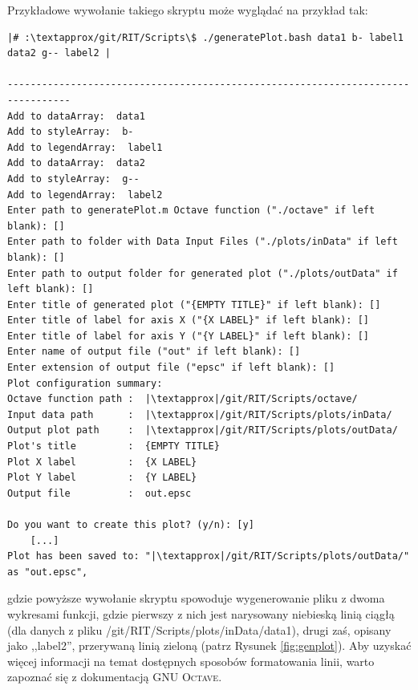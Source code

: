 
Przykładowe wywołanie takiego skryptu może wyglądać na przykład tak:

\begin{verbatim}
|# :\textapprox/git/RIT/Scripts\$ ./generatePlot.bash data1 b- label1 data2 g-- label2 |

---------------------------------------------------------------------------------
Add to dataArray:  data1
Add to styleArray:  b-
Add to legendArray:  label1
Add to dataArray:  data2
Add to styleArray:  g--
Add to legendArray:  label2
Enter path to generatePlot.m Octave function ("./octave" if left blank): []
Enter path to folder with Data Input Files ("./plots/inData" if left blank): [] 
Enter path to output folder for generated plot ("./plots/outData" if left blank): []
Enter title of generated plot ("{EMPTY TITLE}" if left blank): []
Enter title of label for axis X ("{X LABEL}" if left blank): []
Enter title of label for axis Y ("{Y LABEL}" if left blank): []
Enter name of output file ("out" if left blank): []
Enter extension of output file ("epsc" if left blank): []
Plot configuration summary: 
Octave function path :	|\textapprox|/git/RIT/Scripts/octave/
Input data path      :	|\textapprox|/git/RIT/Scripts/plots/inData/
Output plot path     :	|\textapprox|/git/RIT/Scripts/plots/outData/
Plot's title         :	{EMPTY TITLE}
Plot X label         :	{X LABEL}
Plot Y label         :	{Y LABEL}
Output file          :	out.epsc

Do you want to create this plot? (y/n): [y]
	[...]
Plot has been saved to: "|\textapprox|/git/RIT/Scripts/plots/outData/" as "out.epsc",
\end{verbatim}
gdzie powyższe wywołanie skryptu spowoduje wygenerowanie pliku z dwoma wykresami funkcji, gdzie pierwszy z nich jest narysowany niebieską linią ciągłą (dla danych z pliku \textsf{\textapprox/git/RIT/Scripts/plots/inData/data1}), drugi zaś, opisany jako ,,label2'',  przerywaną linią zieloną (patrz Rysunek \ref{fig:genplot}). Aby uzyskać więcej informacji na temat dostępnych sposobów formatowania linii, warto zapoznać się z dokumentacją \textsc{GNU Octave}.

